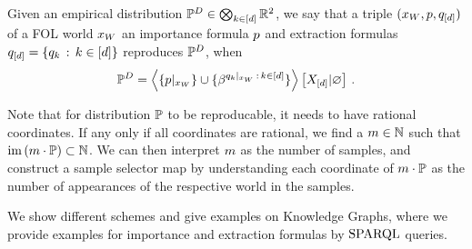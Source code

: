 \begin{definition}
    Given an empirical distribution $\mathbb{P}^{D}\in\bigotimes_{k\in[d]}\mathbb{R}^2$, we say that a triple $(x_{W},p,q_{[d]})$ of a FOL world $x_{W}$ an importance formula $p$ and extraction formulas $q_{[d]}=\{q_{k}\,:\,k\in[d]\}$ reproduces $\mathbb{P}^{D}$, when
    \begin{align*}
        \mathbb{P}^{D}
        = \left\langle \{{p}|_{x_{W}}\}\cup\{\beta^{{q_{k}}|_{x_{W}}\, : \, k\in[d]}\}\right\rangle \left[ X_{[d]} | \varnothing \right] \, .
    \end{align*}
\end{definition}

Note that for distribution $\mathbb{P}$ to be reproducable, it needs to have rational coordinates. %
If any only if all coordinates are rational, we find a $m\in\mathbb{N}$ such that $\mathrm{im}\left(m\cdot\mathbb{P}\right)\subset\mathbb{N}$.
We can then interpret $m$ as the number of samples, and construct a sample selector map by understanding each coordinate of $m\cdot\mathbb{P}$ as the number of appearances of the respective world in the samples.

We show different schemes and give examples on Knowledge Graphs, where we provide examples for importance and extraction formulas by $\mathrm{SPARQL}$ queries.


%



%

